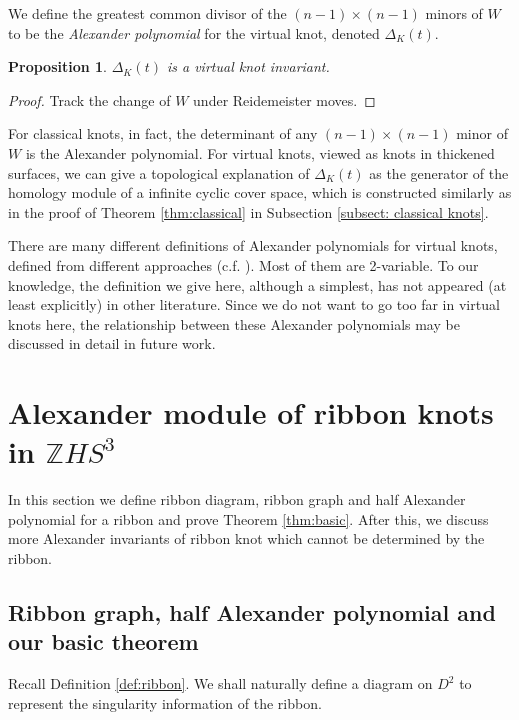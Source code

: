 \documentclass{amsart}
\newtheorem{prop}[thm]{Proposition}
\theoremstyle{definition}
\theoremstyle{remark}
\numberwithin{equation}{subsection}
\begin{document}
We define the greatest common divisor of the $(n - 1) \times (n - 1)$ minors of $W$ to be the \emph{Alexander polynomial} for the virtual knot, denoted $\Delta_K(t)$.

\begin{prop}
$\Delta_K(t)$ is a virtual knot invariant.
\end{prop}

\begin{proof}
Track the change of $W$ under Reidemeister moves.
\end{proof}

For classical knots, in fact, the determinant of any $(n - 1) \times (n - 1)$ minor of $W$ is the Alexander polynomial. For virtual knots, viewed as knots in thickened surfaces, we can give a topological explanation of $\Delta_K(t)$ as the generator of the homology module of a infinite cyclic cover space, which is constructed similarly as in the proof of Theorem \ref{thm:classical} in Subsection \ref{subsect: classical knots}.

There are many different definitions of Alexander polynomials for virtual knots, defined from different approaches (c.f. \cite{JuhaszKauffmanOgasa2022}). Most of them are 2-variable. To our knowledge, the definition we give here, although a simplest, has not appeared (at least explicitly) in other literature. Since we do not want to go too far in virtual knots here, the relationship between these Alexander polynomials may be discussed in detail in future work.

\section{Alexander module of ribbon knots in $ \mathbb{Z}HS^3 $}

In this section we define ribbon diagram, ribbon graph and half Alexander polynomial for a ribbon and prove Theorem \ref{thm:basic}. After this, we discuss more Alexander invariants of ribbon knot which cannot be determined by the ribbon.

\subsection{Ribbon graph, half Alexander polynomial and our basic theorem}\label{subsect:halfalexpoly}

Recall Definition \ref{def:ribbon}. We shall naturally define a diagram on $D^2$ to represent the singularity information of the ribbon.
\end{document}
